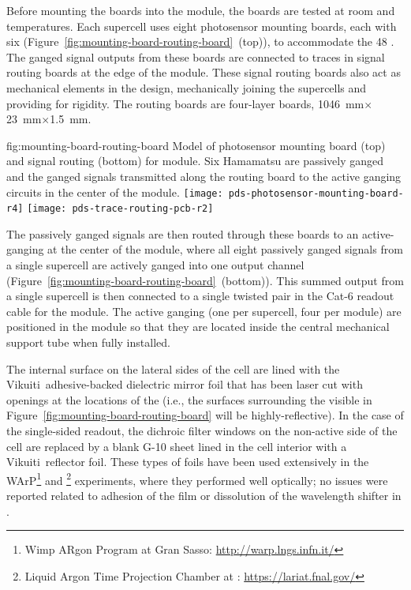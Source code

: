  Before mounting the boards into the  module, the boards are tested at room and  temperatures. 
 Each supercell uses eight photosensor mounting boards, each with six  (Figure~\ref{fig:mounting-board-routing-board}~(top)), 
 to accommodate the 48 .  The ganged signal outputs from these boards are connected to traces in signal routing boards at the edge of the  module. These signal routing boards also act as mechanical elements in the design, mechanically joining the supercells and providing for rigidity.  The routing boards  are four-layer boards, \SI{1046}{mm}$\times$\SI{23}{mm}$\times$\SI{1.5}{mm}.

\begin{dunefigure}
 {fig:mounting-board-routing-board}
{Model of photosensor mounting board (top) and signal routing  (bottom) for  module.  Six Hamamatsu  are passively ganged and the ganged signals transmitted along the routing board to the active ganging circuits in the center of the module.}
\texttt{[image: pds-photosensor-mounting-board-r4]}
\texttt{[image: pds-trace-routing-pcb-r2]}
\end{dunefigure}
The passively ganged signals are then routed through these boards to an active-ganging  at the center of the module, where all eight passively ganged signals from a single supercell are actively ganged into one output channel (Figure~\ref{fig:mounting-board-routing-board}~(bottom)). This summed output from a single supercell is then connected to a single twisted pair in the Cat-6 readout cable for the module.  The active ganging  (one per supercell, four per module) are positioned in the module so that they are located inside the central  mechanical support tube when fully installed.


The  internal surface on the lateral sides of the cell are lined with the Vikuiti\texttrademark\ adhesive-backed dielectric mirror foil
that has been laser cut with openings at the locations of the  (i.e., the  surfaces surrounding the  visible in Figure~\ref{fig:mounting-board-routing-board} will be highly-reflective).  In the case of the single-sided readout, the dichroic filter windows on the non-active side of the cell are replaced by a blank \frfour G-10 sheet lined in the cell interior with a Vikuiti\texttrademark\ reflector foil.
These types of foils have been used extensively in the WArP\footnote{Wimp ARgon Program at Gran Sasso: \url{http://warp.lngs.infn.it/}} and \footnote{Liquid Argon Time Projection Chamber at : \url{https://lariat.fnal.gov/}} experiments, where they performed well optically; no issues were reported related to adhesion of the film or dissolution of the wavelength shifter in .

